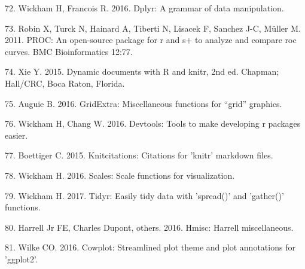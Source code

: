 \documentclass[12pt,]{article}
\begin{document}
\hypertarget{ref-dplyr}{}
72. Wickham H, Francois R. 2016. Dplyr: A grammar of data manipulation.

\hypertarget{ref-pROC}{}
73. Robin X, Turck N, Hainard A, Tiberti N, Lisacek F, Sanchez J-C,
Müller M. 2011. PROC: An open-source package for r and s+ to analyze and
compare roc curves. BMC Bioinformatics 12:77.

\hypertarget{ref-knitr2015}{}
74. Xie Y. 2015. Dynamic documents with R and knitr, 2nd ed. Chapman;
Hall/CRC, Boca Raton, Florida.

\hypertarget{ref-gridExtra}{}
75. Auguie B. 2016. GridExtra: Miscellaneous functions for ``grid''
graphics.

\hypertarget{ref-devtools}{}
76. Wickham H, Chang W. 2016. Devtools: Tools to make developing r
packages easier.

\hypertarget{ref-knitcitations}{}
77. Boettiger C. 2015. Knitcitations: Citations for 'knitr' markdown
files.

\hypertarget{ref-scales}{}
78. Wickham H. 2016. Scales: Scale functions for visualization.

\hypertarget{ref-tidyr}{}
79. Wickham H. 2017. Tidyr: Easily tidy data with 'spread()' and
'gather()' functions.

\hypertarget{ref-Hmisc}{}
80. Harrell Jr FE, Charles Dupont, others. 2016. Hmisc: Harrell
miscellaneous.

\hypertarget{ref-cowplot}{}
81. Wilke CO. 2016. Cowplot: Streamlined plot theme and plot annotations
for 'ggplot2'.
\end{document}
